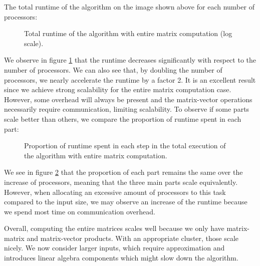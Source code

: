 The total runtime of the algorithm on the image shown above for each number of processors:
\begin{figure}[H]
 \centering
 
 \caption{Total runtime of the algorithm with entire matrix computation (log scale).}
 \label{fig:entire_runtime}
\end{figure}

We observe in figure \ref{fig:entire_runtime} that the runtime decreases significantly with respect to the number of processors.
We can also see that, by doubling the number of processors, we nearly accelerate the runtime by a factor 2.
It is an excellent result since we achieve strong scalability for the entire matrix computation case.
However, some overhead will always be present and the matrix-vector operations necessarily require communication, limiting scalability.
To observe if some parts scale better than others, we compare the proportion of runtime spent in each part:
\begin{figure}[H]
 \centering
 
 \caption{Proportion of runtime spent in each step in the total execution of the algorithm with entire matrix computation.}
 \label{fig:entire_proportion}
\end{figure}

We see in figure \ref{fig:entire_proportion} that the proportion of each part remains the same over the increase of processors, meaning that the three main parts scale equivalently.
However, when allocating an excessive amount of processors to this task compared to the input size, we may observe an increase of the runtime because we spend most time on communication overhead.

Overall, computing the entire matrices scales well because we only have matrix-matrix and matrix-vector products.
With an appropriate cluster, those scale nicely.
We now consider larger inputs, which require approximation and introduces linear algebra components which might slow down the algorithm.
